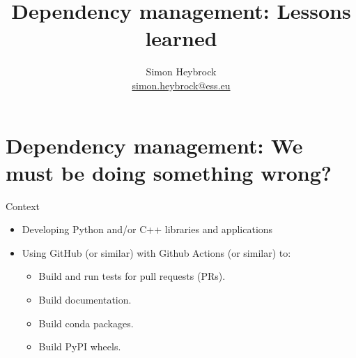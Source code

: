\documentclass[english,aspectratio=1610,smaller]{beamer}
\begin{document}
\title{Dependency management: Lessons learned}
\author[Simon Heybrock]{Simon Heybrock \\{\footnotesize\url{simon.heybrock@ess.eu}}\\\vspace{2mm}}

\date{}

\begin{frame}[plain]
    \titlepage
\end{frame}


\section{Dependency management: We must be doing something wrong?}

\begin{frame}{Context}
  \begin{itemize}
    \item Developing Python and/or C++ libraries and applications
    \item Using GitHub (or similar) with Github Actions (or similar) to:
      \begin{itemize}
        \item Build and run tests for pull requests (PRs).
        \item Build documentation.
        \item Build conda packages.
        \item Build PyPI wheels.
      \end{itemize}
  \end{itemize}
\end{frame}
\end{document}
